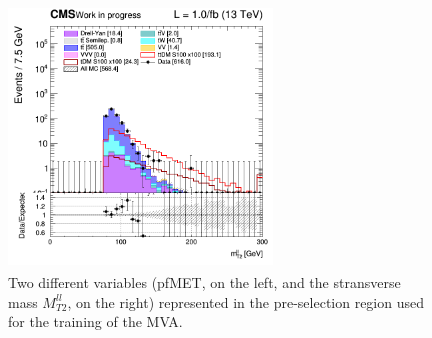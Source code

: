 \documentclass[a4paper, 10pt, openright]{report}
\begin{document}
\begin{figure}[htbp]
{\begin{minipage}[b]{.48\textwidth}
\end{minipage}\hfill
\begin{minipage}[b]{.48\textwidth}
\includegraphics[width=7cm, height=7cm]{figs/2017/SRBlinded-ttDM-scalar100/log_cratio_topCR_ll_mt2ll.png}
\end{minipage} \hfill
}
\caption{Two different variables (pf\ac{MET}, on the left, and the stransverse mass $M_{T2}^{ll}$, on the right) represented in the pre-selection region used for the training of the \ac{MVA}.}
\label{fig:preSelSR}
\end{figure}
\end{document}
